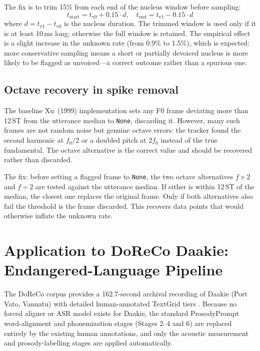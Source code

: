 The fix is to trim 15\% from each end of the nucleus window before sampling:
\begin{equation}
  t_{\mathrm{start}} = t_{\mathrm{v0}} + 0.15 \cdot d, \quad
  t_{\mathrm{end}}   = t_{\mathrm{v1}} - 0.15 \cdot d
\end{equation}
where $d = t_{\mathrm{v1}} - t_{\mathrm{v0}}$ is the nucleus duration. The
trimmed window is used only if it is at least 10\,ms long; otherwise the full
window is retained. The empirical effect is a slight increase in the unknown
rate (from 0.9\% to 1.5\%), which is expected: more conservative sampling means
a short or partially devoiced nucleus is more likely to be flagged as
unvoiced---a correct outcome rather than a spurious one.

\subsection{Octave recovery in spike removal}

The baseline Xu~(1999) implementation sets any F0 frame deviating more than
12\,ST from the utterance median to \texttt{None}, discarding it. However, many
such frames are not random noise but genuine octave errors: the tracker found
the second harmonic at $f_0 / 2$ or a doubled pitch at $2f_0$ instead of the
true fundamental. The octave alternative is the correct value and should be
recovered rather than discarded.

The fix: before setting a flagged frame to \texttt{None}, the two octave
alternatives $f \times 2$ and $f \div 2$ are tested against the utterance
median. If either is within 12\,ST of the median, the closest one replaces the
original frame. Only if both alternatives also fail the threshold is the frame
discarded. This recovers data points that would otherwise inflate the unknown
rate.

\section{Application to DoReCo Daakie: Endangered-Language Pipeline}
\label{sec:doreco_pipeline}

The DoReCo corpus provides a 162.7-second archival recording of Daakie (Port
Vato, Vanuatu) with detailed human-annotated TextGrid tiers
\cite{seifart2022doreco,krifka2024daakie}.
Because no forced aligner or ASR model exists for Daakie, the standard
ProsodyPrompt word-alignment and phonemization stages (Stages 2--4 and 6) are
replaced entirely by the existing human annotations, and only the acoustic
measurement and prosody-labelling stages are applied automatically.

